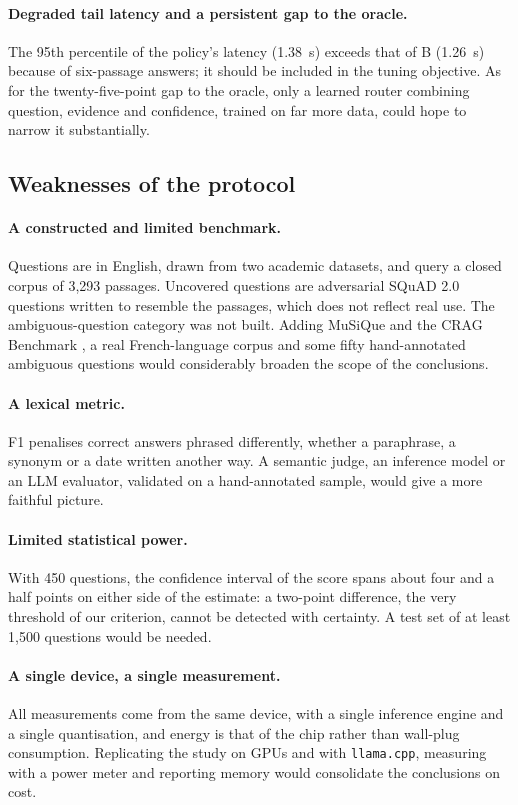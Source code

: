\documentclass[11pt,a4paper]{article}
\begin{document}
\paragraph{Degraded tail latency and a persistent gap to the oracle.} The 95th percentile of the
policy's latency (1.38~s) exceeds that of B (1.26~s) because of six-passage answers; it should be included
in the tuning objective. As for the twenty-five-point gap to the oracle, only a learned router combining
question, evidence and confidence, trained on far more data, could hope to narrow it substantially.

\subsection{Weaknesses of the protocol}

\paragraph{A constructed and limited benchmark.} Questions are in English, drawn from two academic
datasets, and query a closed corpus of 3,293 passages. Uncovered questions are adversarial SQuAD 2.0
questions written to resemble the passages, which does not reflect real use. The ambiguous-question
category was not built. Adding MuSiQue \citep{trivedi2022musique} and the CRAG Benchmark
\citep{yang2024cragbench}, a real French-language corpus and some fifty hand-annotated ambiguous questions
would considerably broaden the scope of the conclusions.

\paragraph{A lexical metric.} F1 penalises correct answers phrased differently, whether a paraphrase, a
synonym or a date written another way. A semantic judge, an inference model or an LLM evaluator,
validated on a hand-annotated sample, would give a more faithful picture.

\paragraph{Limited statistical power.} With 450 questions, the confidence interval of the score spans
about four and a half points on either side of the estimate: a two-point difference, the very threshold
of our criterion, cannot be detected with certainty. A test set of at least 1,500 questions would be
needed.

\paragraph{A single device, a single measurement.} All measurements come from the same device, with a
single inference engine and a single quantisation, and energy is that of the chip rather than wall-plug
consumption. Replicating the study on GPUs and with \texttt{llama.cpp}, measuring with a power meter and
reporting memory would consolidate the conclusions on cost.
\end{document}
